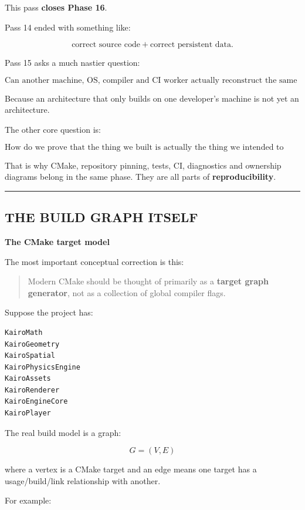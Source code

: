 This pass \textbf{closes Phase 16}.

Pass 14 ended with something like:

\[
\text{correct source code}
+
\text{correct persistent data}.
\]

Pass 15 asks a much nastier question:

\[
\boxed{
\text{Can another machine, OS, compiler and CI worker actually reconstruct the same engine correctly?}
}
\]

Because an architecture that only builds on one developer's machine is not yet an architecture.

The other core question is:

\[
\boxed{
\text{How do we prove that the thing we built is actually the thing we intended to build?}
}
\]

That is why CMake, repository pinning, tests, CI, diagnostics and ownership diagrams belong in the same phase. They are all parts of \textbf{reproducibility}.

\begin{center}\rule{0.5\linewidth}{0.5pt}\end{center}

\subsection{THE BUILD GRAPH ITSELF}\label{01-foundations-i-ch010-the-build-graph-itself}

\textbf{The CMake target model}

The most important conceptual correction is this:

\begin{quote}
Modern CMake should be thought of primarily as a \textbf{target graph generator}, not as a collection of global compiler flags.
\end{quote}

Suppose the project has:

\begin{verbatim}
KairoMath
KairoGeometry
KairoSpatial
KairoPhysicsEngine
KairoAssets
KairoRenderer
KairoEngineCore
KairoPlayer
\end{verbatim}

The real build model is a graph:

\[
G=(V,E)
\]

where a vertex is a CMake target and an edge means one target has a usage/build/link relationship with another.

For example:

